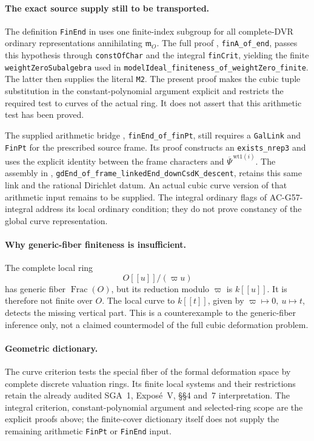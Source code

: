 \paragraph{The exact source supply still to be transported.}
The definition \texttt{FinEnd} in
uses one finite-index subgroup for all complete-DVR
ordinary representations annihilating \(\mathfrak m_O\).
The full proof
,
\texttt{finA\_of\_end}, passes this hypothesis through
\texttt{constOfChar} and the integral
\texttt{finCrit}, yielding the finite
\texttt{weightZeroSubalgebra} used in
\texttt{modelIdeal\_finiteness\_of\_weightZero\_finite}.
The latter then supplies the literal \texttt{M2}.
The present proof makes the cubic tuple substitution
in the constant-polynomial argument explicit and
restricts the required test to curves of the actual
ring.  It does not assert that this arithmetic test
has been proved.

The supplied arithmetic bridge
,
\texttt{finEnd\_of\_finPt}, still requires a
\texttt{GalLink} and \texttt{FinPt} for the prescribed
source frame.  Its proof constructs an
\texttt{exists\_nrep3} and uses the explicit identity
between the frame characters and
\(\overline\Psi^{\,\mathrm{wt1}(i)}\).
The assembly in
,
\texttt{gdEnd\_of\_frame\_linkedEnd\_downCsdK\_descent},
retains this same link and the rational Dirichlet datum.
An actual cubic curve version of that arithmetic
input remains to be supplied.
The integral ordinary flags of AC-G57-integral
address its local ordinary condition; they do not
prove constancy of the global curve representation.

\paragraph{Why generic-fiber finiteness is insufficient.}
The complete local ring
\[
                 O[[u]]/(\varpi u)
                                                               \tag{G59.7}
\]
has generic fiber \(\operatorname{Frac}(O)\), but
its reduction modulo \(\varpi\) is \(k[[u]]\).
It is therefore not finite over \(O\).
The local curve to \(k[[t]]\), given by
\(\varpi\mapsto0,\ u\mapsto t\), detects the missing
vertical part.
This is a counterexample to the generic-fiber
inference only, not a claimed countermodel of the
full cubic deformation problem.

\paragraph{Geometric dictionary.}
The curve criterion tests the special fiber of the
formal deformation space by complete discrete
valuation rings.
Its finite local systems and their restrictions
retain the already audited SGA~1, Expos\'e~V,
\S\S4 and~7 interpretation.
The integral criterion, constant-polynomial
argument and selected-ring scope are the explicit
proofs above; the finite-cover dictionary itself
does not supply the remaining arithmetic
\texttt{FinPt} or \texttt{FinEnd} input.
